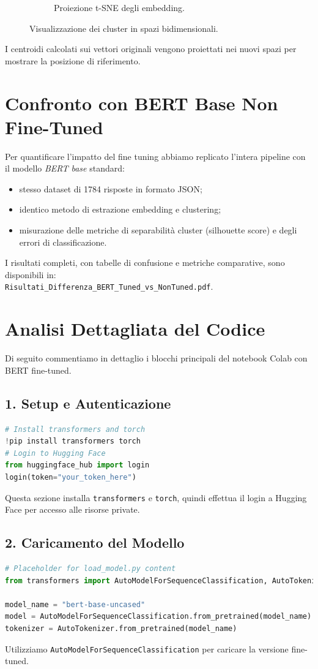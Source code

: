 \documentclass[a4paper,11pt]{article}
\begin{document}
\begin{figure}[H]
\begin{subfigure}[b]{0.48\textwidth}
    \caption{Proiezione t-SNE degli embedding.}
  \end{subfigure}
  \caption{Visualizzazione dei cluster in spazi bidimensionali.}
  \label{fig:highdim_clustering}
\end{figure}

I centroidi calcolati sui vettori originali vengono proiettati nei nuovi spazi per mostrare la posizione di riferimento.

\section{Confronto con BERT Base Non Fine-Tuned}
Per quantificare l'impatto del fine tuning abbiamo replicato l'intera pipeline con il modello \emph{BERT base} standard:
\begin{itemize}
  \item stesso dataset di 1784 risposte in formato JSON;
  \item identico metodo di estrazione embedding e clustering;
  \item misurazione delle metriche di separabilità cluster (silhouette score) e degli errori di classificazione.
\end{itemize}
I risultati completi, con tabelle di confusione e metriche comparative, sono disponibili in:\\
\noindent\texttt{Risultati\_Differenza\_BERT\_Tuned\_vs\_NonTuned.pdf}.

\section{Analisi Dettagliata del Codice}
Di seguito commentiamo in dettaglio i blocchi principali del notebook Colab con BERT fine-tuned.

\subsection*{1. Setup e Autenticazione}
\begin{lstlisting}[language=Python]
# Install transformers and torch
!pip install transformers torch
# Login to Hugging Face
from huggingface_hub import login
login(token="your_token_here")
\end{lstlisting}
Questa sezione installa \texttt{transformers} e \texttt{torch}, quindi effettua il login a Hugging Face per accesso alle risorse private.

\subsection*{2. Caricamento del Modello}
\begin{lstlisting}[language=Python]
# Placeholder for load_model.py content
from transformers import AutoModelForSequenceClassification, AutoTokenizer

model_name = "bert-base-uncased"
model = AutoModelForSequenceClassification.from_pretrained(model_name)
tokenizer = AutoTokenizer.from_pretrained(model_name)
\end{lstlisting}
Utilizziamo \texttt{AutoModelForSequenceClassification} per caricare 
la versione fine-tuned.
\end{document}
